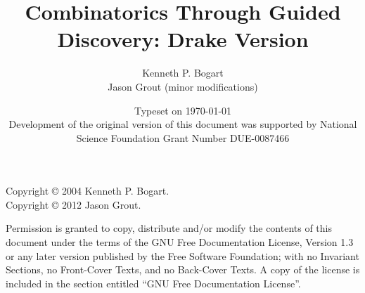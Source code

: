 \documentclass[12 pt]{book}
\title{Combinatorics Through Guided
  Discovery: Drake Version}
\author{Kenneth P. Bogart \\
  Jason Grout (minor modifications)}
\date{Typeset on \today\\
  \vfill \normalsize Development of the original version of this document was
  supported by National Science Foundation Grant Number DUE-0087466}
\begin{document}
\frontmatter
\maketitle
\vspace*{\fill}
\noindent Copyright  \copyright{} 2004 Kenneth P. Bogart.  \\
Copyright  \copyright{} 2012 Jason Grout.

\noindent Permission is granted to copy, distribute and/or modify the contents
of this document under the terms of the GNU Free Documentation License,
Version 1.3 or any later version published by the Free Software
Foundation; with no Invariant Sections, no Front-Cover Texts, and no
Back-Cover Texts.  A copy of the license is included in the section
entitled ``GNU Free Documentation License''.

\tableofcontents

%


\mainmatter




 







\backmatter
\printindex
\end{document}

